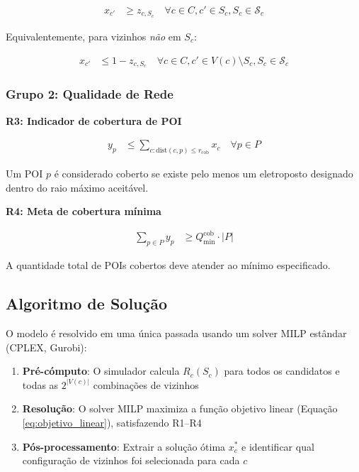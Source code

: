 \begin{align}
x_{c'} &\geq z_{c,S_c} \quad \forall c \in C, c' \in S_c, S_c \in \mathcal{S}_c \label{eq:restricao_consistencia}
\end{align}

Equivalentemente, para vizinhos \textit{não} em $S_c$:

\begin{align}
x_{c'} &\leq 1 - z_{c,S_c} \quad \forall c \in C, c' \in V(c) \setminus S_c, S_c \in \mathcal{S}_c \label{eq:restricao_exclusao}
\end{align}

\subsubsection{Grupo 2: Qualidade de Rede}

\hspace{0.5cm} \textbf{R3: Indicador de cobertura de POI}

\begin{align}
y_p &\leq \sum_{c: \text{dist}(c,p) \leq r_{\text{cob}}} x_c \quad \forall p \in P \label{eq:cobertura_poi}
\end{align}

Um POI $p$ é considerado coberto se existe pelo menos um eletroposto designado dentro do raio máximo aceitável.

\hspace{0.5cm} \textbf{R4: Meta de cobertura mínima}

\begin{align}
\sum_{p \in P} y_p &\geq Q_{\min}^{\text{cob}} \cdot |P| \label{eq:meta_cobertura}
\end{align}

A quantidade total de POIs cobertos deve atender ao mínimo especificado.

\subsection{Algoritmo de Solução}

O modelo é resolvido em uma única passada usando um solver MILP estândar (CPLEX, Gurobi):

\begin{enumerate}
    \item \textbf{Pré-cómputo}: O simulador calcula $R_c(S_c)$ para todos os candidatos e todas as $2^{|V(c)|}$ combinações de vizinhos
    \item \textbf{Resolução}: O solver MILP maximiza a função objetivo linear (Equação \ref{eq:objetivo_linear}), satisfazendo R1--R4
    \item \textbf{Pós-processamento}: Extrair a solução ótima $x_c^*$ e identificar qual configuração de vizinhos foi selecionada para cada $c$
\end{enumerate}

